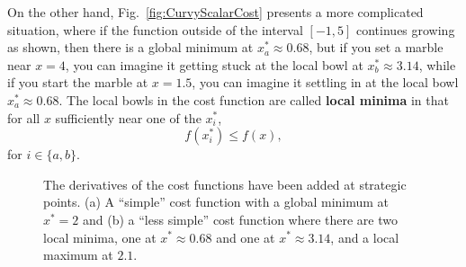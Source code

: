 On the other hand, Fig.~\ref{fig:CurvyScalarCost} presents a more complicated situation, where if the function outside of the interval $[-1, 5]$ continues growing as shown, then there is a global minimum at $x^\ast_a \approx 0.68$, but if you set a marble near $x=4$, you can imagine it getting stuck at the local bowl at $x^\ast_b \approx 3.14$, while if you start the marble at $x=1.5$, you can imagine it settling in at the local bowl  $x^\ast_a \approx 0.68$. The local bowls in the cost function are called \textbf{local minima} in that for all $x$ sufficiently near one of the $x^\ast_i$, 
$$f(x^\ast_i) \le f(x), $$
for $i\in \{a, b \}$.\\


\begin{figure}[htb]%
\centering
{}%
\hspace{5pt}%
%
\caption[]{The derivatives of the cost functions have been added at strategic points. (a) A ``simple'' cost function with a global minimum at $x^\ast=2$ and (b) a ``less simple'' cost function where there are two local minima, one at $x^\ast\approx 0.68$ and one at $x^\ast\approx 3.14$, and a local maximum at $2.1$.}
    \label{fig:ScalarCostsDerivatives}
\end{figure}

\vspace*{.4cm}

